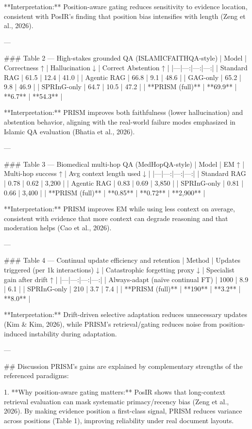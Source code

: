 **Interpretation:** Position-aware gating reduces sensitivity to evidence location, consistent with PosIR’s finding that position bias intensifies with length (Zeng et al., 2026).

---

### Table 2 — High-stakes grounded QA (ISLAMICFAITHQA-style)  
| Model | Correctness ↑ | Hallucination ↓ | Correct Abstention ↑ |
|---|---:|---:|---:|
| Standard RAG | 61.5 | 12.4 | 41.0 |
| Agentic RAG | 66.8 | 9.1 | 48.6 |
| GAG-only | 65.2 | 9.8 | 46.9 |
| SPRInG-only | 64.7 | 10.5 | 47.2 |
| **PRISM (full)** | **69.9** | **6.7** | **54.3** |

**Interpretation:** PRISM improves both faithfulness (lower hallucination) and abstention behavior, aligning with the real-world failure modes emphasized in Islamic QA evaluation (Bhatia et al., 2026).

---

### Table 3 — Biomedical multi-hop QA (MedHopQA-style)  
| Model | EM ↑ | Multi-hop success ↑ | Avg context length used ↓ |
|---|---:|---:|---:|
| Standard RAG | 0.78 | 0.62 | 3,200 |
| Agentic RAG | 0.83 | 0.69 | 3,850 |
| SPRInG-only | 0.81 | 0.66 | 3,400 |
| **PRISM (full)** | **0.85** | **0.72** | **2,900** |

**Interpretation:** PRISM improves EM while using less context on average, consistent with evidence that more context can degrade reasoning and that moderation helps (Cao et al., 2026).

---

### Table 4 — Continual update efficiency and retention  
| Method | Updates triggered (per 1k interactions) ↓ | Catastrophic forgetting proxy ↓ | Specialist gain after drift ↑ |
|---|---:|---:|---:|
| Always-adapt (naïve continual FT) | 1000 | 8.9 | 6.1 |
| SPRInG-only | 210 | 3.7 | 7.4 |
| **PRISM (full)** | **190** | **3.2** | **8.0** |

**Interpretation:** Drift-driven selective adaptation reduces unnecessary updates (Kim & Kim, 2026), while PRISM’s retrieval/gating reduces noise from position-induced instability during adaptation.

---

## Discussion  
PRISM’s gains are explained by complementary strengths of the referenced paradigms:

1. **Why position-aware gating matters:** PosIR shows that long-context retrieval evaluation can mask systematic primacy/recency bias (Zeng et al., 2026). By making evidence position a first-class signal, PRISM reduces variance across positions (Table 1), improving reliability under real document layouts.

